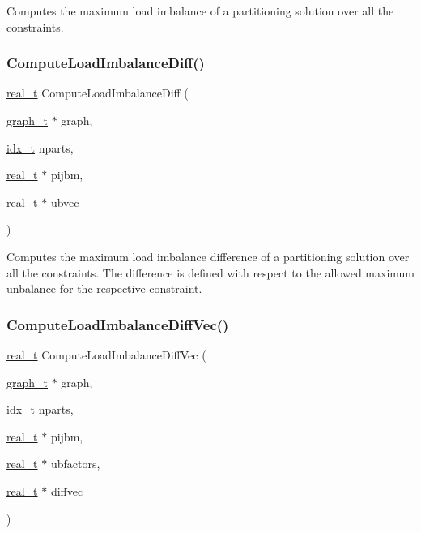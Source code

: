 Computes the maximum load imbalance of a partitioning solution over all the constraints. \mbox{\label{a00230_ad4d848110f5b7dd58d068ea6dc26c49c}} 
\subsubsection{\texorpdfstring{Compute\+Load\+Imbalance\+Diff()}{ComputeLoadImbalanceDiff()}}
{\footnotesize\ttfamily \hyperlink{a00876_a1924a4f6907cc3833213aba1f07fcbe9}{real\+\_\+t} Compute\+Load\+Imbalance\+Diff (\begin{DoxyParamCaption}\item[{\hyperlink{a00734}{graph\+\_\+t} $\ast$}]{graph,  }\item[{\hyperlink{a00876_aaa5262be3e700770163401acb0150f52}{idx\+\_\+t}}]{nparts,  }\item[{\hyperlink{a00876_a1924a4f6907cc3833213aba1f07fcbe9}{real\+\_\+t} $\ast$}]{pijbm,  }\item[{\hyperlink{a00876_a1924a4f6907cc3833213aba1f07fcbe9}{real\+\_\+t} $\ast$}]{ubvec }\end{DoxyParamCaption})}

Computes the maximum load imbalance difference of a partitioning solution over all the constraints. The difference is defined with respect to the allowed maximum unbalance for the respective constraint. \mbox{\label{a00230_a232d17c76d3e7d402ea128d0de5b8138}} 
\subsubsection{\texorpdfstring{Compute\+Load\+Imbalance\+Diff\+Vec()}{ComputeLoadImbalanceDiffVec()}}
{\footnotesize\ttfamily \hyperlink{a00876_a1924a4f6907cc3833213aba1f07fcbe9}{real\+\_\+t} Compute\+Load\+Imbalance\+Diff\+Vec (\begin{DoxyParamCaption}\item[{\hyperlink{a00734}{graph\+\_\+t} $\ast$}]{graph,  }\item[{\hyperlink{a00876_aaa5262be3e700770163401acb0150f52}{idx\+\_\+t}}]{nparts,  }\item[{\hyperlink{a00876_a1924a4f6907cc3833213aba1f07fcbe9}{real\+\_\+t} $\ast$}]{pijbm,  }\item[{\hyperlink{a00876_a1924a4f6907cc3833213aba1f07fcbe9}{real\+\_\+t} $\ast$}]{ubfactors,  }\item[{\hyperlink{a00876_a1924a4f6907cc3833213aba1f07fcbe9}{real\+\_\+t} $\ast$}]{diffvec }\end{DoxyParamCaption})}

